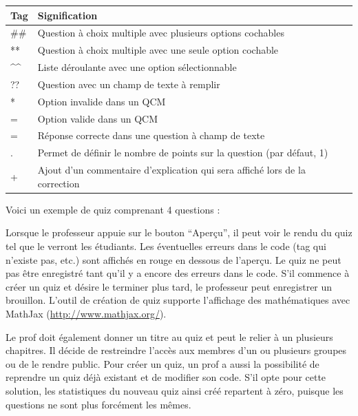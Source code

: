 \documentclass[letterpaper,10pt,french]{sphinxmanual}
\begin{document}
\begin{tabulary}{\linewidth}{|L|L|}
\hline
\textsf{\relax 
Tag
} & \textsf{\relax 
Signification
}\\
\hline
\#\#
 & 
Question à choix multiple avec plusieurs options cochables
\\

**
 & 
Question à choix multiple avec une seule option cochable
\\

\textasciicircum{}\textasciicircum{}
 & 
Liste déroulante avec une option sélectionnable
\\

??
 & 
Question avec un champ de texte à remplir
\\

*
 & 
Option invalide dans un QCM
\\

=
 & 
Option valide dans un QCM
\\

=
 & 
Réponse correcte dans une question à champ de texte
\\

.
 & 
Permet de définir le nombre de points sur la question (par défaut, 1)
\\

+
 & 
Ajout d'un commentaire d'explication qui sera affiché lors de la correction
\\
\hline\end{tabulary}


Voici un exemple de quiz comprenant 4 questions :

Lorsque le professeur appuie sur le bouton ``Aperçu'', il peut voir le rendu du quiz tel que le verront les étudiants. Les éventuelles erreurs dans le code (tag qui n'existe pas, etc.) sont affichés en rouge en dessous de l'aperçu. Le quiz ne peut pas être enregistré tant qu'il y a encore des erreurs dans le code. S'il commence à créer un quiz et désire le terminer plus tard, le professeur peut enregistrer un brouillon. L'outil de création de quiz supporte l'affichage des mathématiques avec MathJax (\href{http://www.mathjax.org/}{http://www.mathjax.org/}).

Le prof doit également donner un titre au quiz et peut le relier à un plusieurs chapitres. Il décide de restreindre l'accès aux membres d'un ou plusieurs groupes ou de le rendre public. Pour créer un quiz, un prof a aussi la possibilité de reprendre un quiz déjà existant et de modifier son code. S'il opte pour cette solution, les statistiques du nouveau quiz ainsi créé repartent à zéro, puisque les questions ne sont plus forcément les mêmes.
\end{document}
